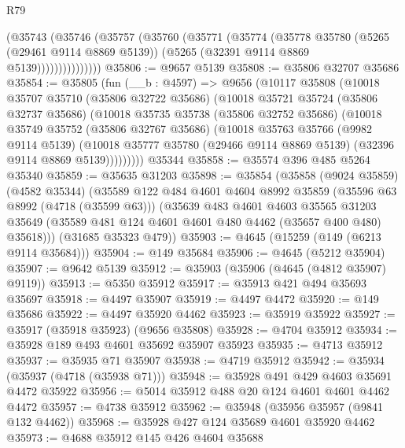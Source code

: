 \begin{lexlean}{R79}
\begin{coremodule}
                (@35743
                  (@35746
                    (@35757
                      (@35760
                        (@35771
                          (@35774
                            (@35778
                              @35780
                              (@5265 (@29461 @9114 @8869 @5139))
                              (@5265 (@32391 @9114 @8869 @5139)))))))))))))))
@35806 := @9657 @5139
@35808 := @35806 @32707 @35686
@35854 := @35805
    (fun (__b : @4597) =>
    @9656
      (@10117
        @35808
        (@10018
          @35707
          @35710
          (@35806 @32722 @35686)
          (@10018
            @35721
            @35724
            (@35806 @32737 @35686)
            (@10018
              @35735
              @35738
              (@35806 @32752 @35686)
              (@10018
                @35749
                @35752
                (@35806 @32767 @35686)
                (@10018
                  @35763
                  @35766
                  (@9982 @9114 @5139)
                  (@10018
                    @35777
                    @35780
                    (@29466 @9114 @8869 @5139)
                    (@32396 @9114 @8869 @5139)))))))))
    @35344
@35858 := @35574 @396 @485 @5264 @35340
@35859 := @35635 @31203
@35898 := @35854
    (@35858
      (@9024 @35859)
      (@4582 @35344)
      (@35589
        @122
        @484
        @4601
        @4604
        @8992
        @35859
        (@35596 @63 @8992 (@4718 (@35599 @63)))
        (@35639
          @483
          @4601
          @4603
          @35565
          @31203
          @35649
          (@35589 @481 @124 @4601 @4601 @480 @4462 (@35657 @400 @480) @35618)))
      (@31685 @35323 @479))
@35903 := @4645 (@15259 (@149 (@6213 @9114 @35684)))
@35904 := @149 @35684
@35906 := @4645 (@5212 @35904)
@35907 := @9642 @5139
@35912 := @35903 (@35906 (@4645 (@4812 @35907) @9119))
@35913 := @5350 @35912
@35917 := @35913 @421 @494 @35693 @35697
@35918 := @4497 @35907
@35919 := @4497 @4472
@35920 := @149 @35686
@35922 := @4497 @35920 @4462
@35923 := @35919 @35922
@35927 := @35917 (@35918 @35923) (@9656 @35808)
@35928 := @4704 @35912
@35934 := @35928 @189 @493 @4601 @35692 @35907 @35923
@35935 := @4713 @35912
@35937 := @35935 @71 @35907
@35938 := @4719 @35912
@35942 := @35934 (@35937 (@4718 (@35938 @71)))
@35948 := @35928 @491 @429 @4603 @35691 @4472 @35922
@35956 := @5014 @35912 @488 @20 @124 @4601 @4601 @4462 @4472
@35957 := @4738 @35912
@35962 := @35948 (@35956 @35957 (@9841 @132 @4462))
@35968 := @35928 @427 @124 @35689 @4601 @35920 @4462
@35973 := @4688 @35912 @145 @426 @4604 @35688

\end{coremodule}
\end{lexlean}
